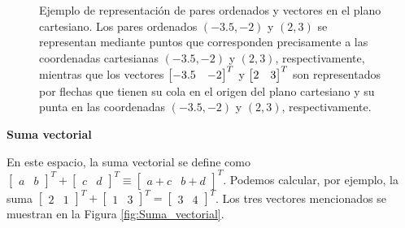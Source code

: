 \documentclass[12pt]{article}
\begin{document}
\begin{figure}[h!]
    \centering
    \caption{Ejemplo de representación de pares ordenados y vectores en el plano cartesiano. Los pares ordenados $(-3.5,-2)$ y $(2,3)$ se representan mediante puntos que corresponden precisamente a las coordenadas cartesianas $(-3.5,-2)$ y $(2,3)$, respectivamente, mientras que los vectores $\protect\begin{bmatrix} -3.5 & -2 \protect\end{bmatrix}^T$ y $\protect\begin{bmatrix} 2 & 3 \protect\end{bmatrix}^T$ son representados por flechas que tienen su cola en el origen del plano cartesiano y su punta en las coordenadas $(-3.5,-2)$ y $(2,3)$, respectivamente.} 
    \label{fig:Correspondencias_del_plano_cartesiano}
\end{figure}

\vspace{3mm}
\textbf{Suma vectorial}
\vspace{3mm}

    En este espacio, la suma vectorial se define como $\begin{bmatrix}a&b\end{bmatrix}^T+\begin{bmatrix}c&d\end{bmatrix}^T\equiv\begin{bmatrix}a+c&b+d\end{bmatrix}^T$. Podemos calcular, por ejemplo, la suma $\begin{bmatrix}2&1\end{bmatrix}^T+\begin{bmatrix}1&3\end{bmatrix}^T=\begin{bmatrix}3&4\end{bmatrix}^T$. Los tres vectores mencionados se muestran en la Figura \ref{fig:Suma_vectorial}.
\end{document}
